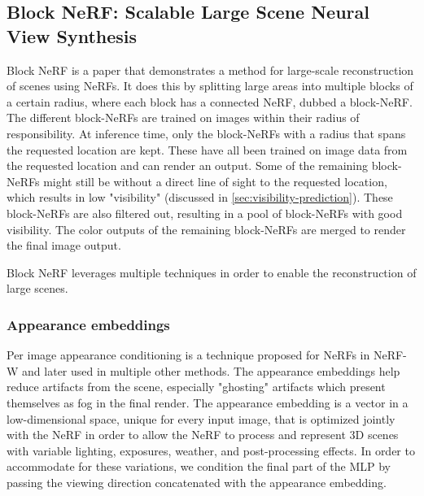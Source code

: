 \subsection{Block NeRF: Scalable Large Scene Neural View Synthesis} \label{sec:block-nerf}
Block NeRF is a paper that demonstrates a method for large-scale reconstruction of scenes using NeRFs. It does this by splitting large areas into multiple blocks of a certain radius, where each block has a connected NeRF, dubbed a block-NeRF. The different block-NeRFs are trained on images within their radius of responsibility. At inference time, only the block-NeRFs with a radius that spans the requested location are kept. These have all been trained on image data from the requested location and can render an output. Some of the remaining block-NeRFs might still be without a direct line of sight to the requested location, which results in low "visibility" (discussed in \autoref{sec:visibility-prediction}). These block-NeRFs are also filtered out, resulting in a pool of block-NeRFs with good visibility. The color outputs of the remaining block-NeRFs are merged to render the final image output.

Block NeRF leverages multiple techniques in order to enable the reconstruction of large scenes.

\subsubsection{Appearance embeddings} \label{sec:appearance-embeddings}
Per image appearance conditioning is a technique proposed for NeRFs in NeRF\nobreakdash-W \cite{martin-brualla_nerf_2021} and later used in multiple other methods. The appearance embeddings help reduce artifacts from the scene, especially "ghosting" artifacts which present themselves as fog in the final render. The appearance embedding is a vector in a low-dimensional space, unique for every input image, that is optimized jointly with the NeRF in order to allow the NeRF to process and represent 3D scenes with variable lighting, exposures, weather, and post-processing effects. In order to accommodate for these variations, we condition the final part of the MLP by passing the viewing direction concatenated with the appearance embedding. 

